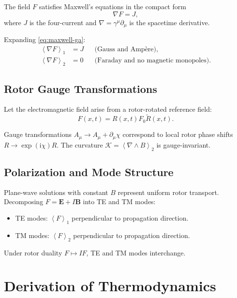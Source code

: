 \documentclass[11pt,a4paper]{article}
\numberwithin{equation}{section}
\theoremstyle{plain}
\theoremstyle{definition}
\theoremstyle{remark}
\newcommand{\grade}[2]{\left\langle #1 \right\rangle_{#2}}
\newcommand{\vecp}[1]{\grade{#1}{1}}       %
\newcommand{\biv}[1]{\grade{#1}{2}}        %
\newcommand{\rev}[1]{\widetilde{#1}}       %
\newcommand{\ii}{\mathrm{i}}
\begin{document}
The field $F$ satisfies Maxwell's equations in the compact form
\begin{equation}
\boxed{\nabla F = J,}
\label{eq:maxwell-ga}
\end{equation}
where $J$ is the four-current and $\nabla = \gamma^\mu\partial_\mu$ is the spacetime derivative.

Expanding \eqref{eq:maxwell-ga}:
\begin{align}
\vecp{\nabla F} &= J && \text{(Gauss and Ampère)},\\
\biv{\nabla F} &= 0 && \text{(Faraday and no magnetic monopoles)}.
\end{align}

\subsection{Rotor Gauge Transformations}

Let the electromagnetic field arise from a rotor-rotated reference field:
\begin{equation}
F(x,t) = R(x,t) F_0 \rev{R}(x,t).
\end{equation}

Gauge transformations $A_\mu \to A_\mu + \partial_\mu\chi$ correspond to local rotor phase shifts $R \to \exp(\ii\chi)R$. The curvature $\mathcal{K} = \biv{\nabla \wedge B}$ is gauge-invariant.

\subsection{Polarization and Mode Structure}

Plane-wave solutions with constant $B$ represent uniform rotor transport. Decomposing $F = \mathbf{E} + I\mathbf{B}$ into TE and TM modes:
\begin{itemize}
\item TE modes: $\vecp{F}$ perpendicular to propagation direction.
\item TM modes: $\biv{F}$ perpendicular to propagation direction.
\end{itemize}

Under rotor duality $F \mapsto IF$, TE and TM modes interchange.

\section{Derivation of Thermodynamics}
\label{sec:thermo}
\end{document}
